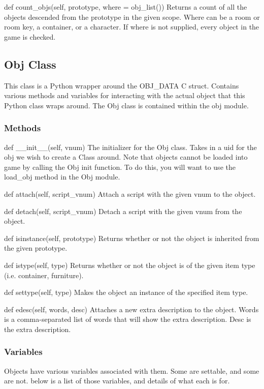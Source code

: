 \documentclass[12pt]{article}
\begin{document}
def count\_objs(self, prototype, where = obj\_list()) \newline
Returns a count of all the objects descended from the prototype in the given scope. Where can be a room or room key, a container, or a character. If where is not supplied, every object in the game is checked.

\subsection{Obj Class}
This class is a Python wrapper around the OBJ\_DATA C struct. Contains various methods and variables for interacting with the actual object that this Python class wraps around. The Obj class is contained within the obj module.

\subsubsection{Methods}
def \_\_init\_\_(self, vnum) \newline
The initializer for the Obj class. Takes in a uid for the obj we wish to create a Class around. Note that objects cannot be loaded into game by calling the Obj init function. To do this, you will want to use the load\_obj method in the Obj module.

def attach(self, script\_vnum) \newline
Attach a script with the given vnum to the object.

def detach(self, script\_vnum) \newline
Detach a script with the given vnum from the object.

def isinstance(self, prototype) \newline
Returns whether or not the object is inherited from the given prototype.

def istype(self, type) \newline
Returns whether or not the object is of the given item type (i.e. container, furniture).

def settype(self, type) \newline
Makes the object an instance of the specified item type.

def edesc(self, words, desc) \newline
Attaches a new extra description to the object. Words is a comma-separated list of words that will show the extra description. Desc is the extra description.



\subsubsection{Variables}
Objects have various variables associated with them. Some are settable, and some are not. below is a list of those variables, and details of what each is for.
\end{document}
